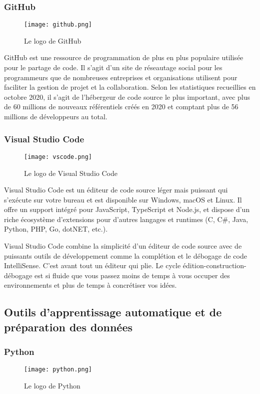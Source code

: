    \subsubsection{GitHub}
    \begin{figure}[H]
        \centering
        \texttt{[image: github.png]}
        \caption{Le logo de GitHub}\label{fig:github}
    \end{figure}
    GitHub est une ressource de programmation de plus en plus populaire utilisée pour le partage de code. Il s'agit d'un site de réseautage social pour les programmeurs que de nombreuses entreprises et organisations utilisent pour faciliter la gestion de projet et la collaboration. Selon les statistiques recueillies en octobre 2020, il s'agit de l'hébergeur de code source le plus important, avec plus de 60 millions de nouveaux référentiels créés en 2020 et comptant plus de 56 millions de développeurs au total.
    \subsubsection{Visual Studio Code}
    \begin{figure}[H]
        \centering
        \texttt{[image: vscode.png]}
        \caption{Le logo de Visual Studio Code}\label{fig:vscode}
    \end{figure}
    Visual Studio Code est un éditeur de code source léger mais puissant qui s'exécute sur votre bureau et est disponible sur Windows, macOS et Linux. Il offre un support intégré pour JavaScript, TypeScript et Node.js, et dispose d'un riche écosystème d'extensions pour d'autres langages et runtimes (C, C\#, Java, Python, PHP, Go, dotNET, etc.).

    Visual Studio Code combine la simplicité d'un éditeur de code source avec de puissants outils de développement comme la complétion et le débogage de code IntelliSense. 
 C'est avant tout un éditeur qui plie. Le cycle édition-construction-débogage est si fluide que vous passez moins de temps à vous occuper des environnements et plus de temps à concrétiser vos idées.

    \subsection{Outils d'apprentissage automatique et de préparation des données}
    \subsubsection{Python}
    \begin{figure}[H]
        \centering
        \texttt{[image: python.png]}
        \caption{Le logo de Python}\label{fig:python}
    \end{figure}

